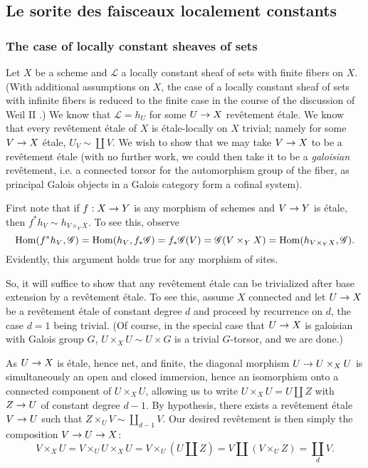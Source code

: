 \documentclass[deligne.tex]{subfiles}
\begin{document}
\subsection{Le sorite des faisceaux localement constants}
\subsubsection*{The case of locally constant sheaves of sets}
Let $X$ be a scheme and $\mathscr L$ a locally constant sheaf of 
sets with finite fibers on $X$.
(With additional assumptions on $X$, the case of a
locally constant sheaf of sets with infinite fibers is reduced to the finite
case in the course of the discussion of Weil II .)
We know that $\mathscr L=h_U$ for some $U\rightarrow X$ revêtement étale.
We know that every revêtement étale of $X$ is étale-locally on $X$ trivial;
namely for some $V\rightarrow X$ étale, $U_V\sim\coprod V$. We wish to show that we may
take $V\rightarrow X$ to be a revêtement étale
(with no further work, we could then take it to be a \emph{galoisian} 
revêtement, i.e. a connected torsor for the automorphism group of the fiber, 
as principal Galois objects in a Galois category form a cofinal system).

First note that if $f:X\rightarrow Y$ is any morphism of schemes and $V\rightarrow Y$ is étale,
then $f^\ast h_V\sim h_{V\times_Y X}$.
To see this, observe
\begin{equation*}
    \operatorname{Hom}(f^\ast h_V,\mathscr G)
    =\operatorname{Hom}(h_V, f_\ast\mathscr G)
    =f_\ast\mathscr G(V)
    =\mathscr G(V\times_Y X)
    =\operatorname{Hom}(h_{V\times_Y X},\mathscr G).
\end{equation*}
Evidently, this argument holds true for any morphism of sites.

So, it will suffice to show that any revêtement étale can be trivialized
after base extension by a revêtement étale. To see this, assume $X$ connected 
and let $U\rightarrow X$ be a revêtement étale of constant degree $d$ and proceed by 
recurrence on $d$, the case $d=1$ being trivial.
(Of course, in the special case that $U\rightarrow X$ is galoisian with Galois group $G$,
$U\times_X U\sim U\times G$ is a trivial $G$-torsor, and we are done.)

As $U\rightarrow X$ is étale, hence net, and finite, the diagonal morphism
$U\rightarrow U\times_X U$ is simultaneously an open and closed immersion, hence
an isomorphism onto a connected component of
$U\times_X U$, allowing us to write $U\times_X U=U\coprod Z$ with
$Z\rightarrow U$ of constant degree $d-1$. By hypothesis, there exists a revêtement
étale $V\rightarrow U$ such that $Z\times_U V\sim\coprod_{d-1}V$.
Our desired revêtement is then simply the composition $V\rightarrow U\rightarrow X$:
\begin{equation*}
    V\times_X U=V\times_U U\times_X U=V\times_U(U{\textstyle\coprod} Z)
    =V{\textstyle\coprod} (V\times_U Z)={\textstyle\coprod}_d V.
\end{equation*}
\end{document}
